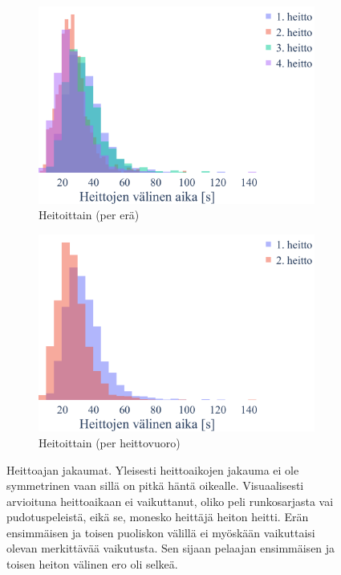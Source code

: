 \begin{figure}[!ht]
\begin{subfigure}[b]{0.49\textwidth}
            \centering
            \includegraphics[width=\textwidth]{figures/heitot3.pdf}
            \caption{Heitoittain (per erä)\label{fig:throw}}
        \end{subfigure}
        \hfill
        \begin{subfigure}[b]{0.49\textwidth}
            \centering
            \includegraphics[width=\textwidth]{figures/heitot4.pdf}
            \caption{Heitoittain (per heittovuoro)\label{fig:throw2}}
        \end{subfigure}
        \caption{
            Heittoajan jakaumat.
            Yleisesti heittoaikojen jakauma ei ole symmetrinen vaan sillä on pitkä häntä oikealle.
            Visuaalisesti arvioituna heittoaikaan ei vaikuttanut, oliko peli runkosarjasta vai pudotuspeleistä,
            eikä se, monesko heittäjä heiton heitti.
            Erän ensimmäisen ja toisen puoliskon välillä ei myöskään vaikuttaisi olevan merkittävää vaikutusta.
            Sen sijaan pelaajan ensimmäisen ja toisen heiton välinen ero oli selkeä.\label{fig:throws}
        }
    \end{figure}

